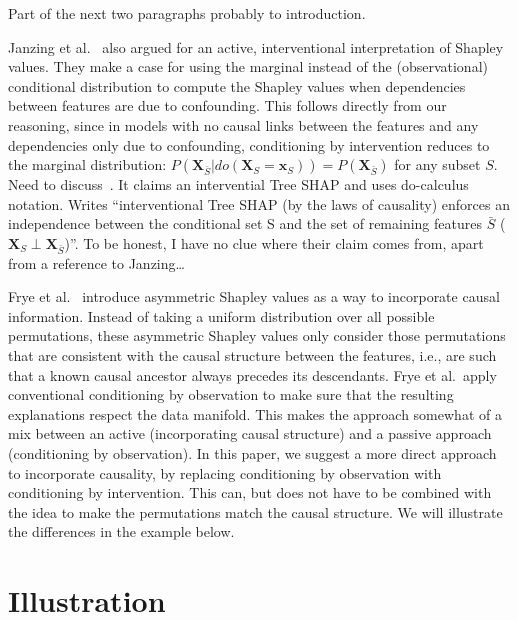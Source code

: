 \documentclass{article}
\newcommand{\vX}{\mathbf{X}}
\newcommand{\vx}{\mathbf{x}}
\newcommand{\dodo}{\mathit{do}}
\newcommand{\lvdo}[1]{\dodo(\vX_{#1} = \vx_{#1})}
\newcommand{\comment}[1]{{\color{red} #1}}
\begin{document}
\comment{Part of the next two paragraphs probably to introduction.}

Janzing et al.~\cite{janzing2019feature} also argued for an active, interventional interpretation of Shapley values. They make a case for using the marginal instead of the (observational) conditional distribution to compute the Shapley values when dependencies between features are due to confounding. This follows directly from our reasoning, since in models with no causal links between the features and any dependencies only due to confounding, conditioning by intervention reduces to the marginal distribution: $P(\vX_{\bar{S}}|\lvdo{S}) = P(\vX_{\bar{S}})$ for any subset $S$. \comment{Need to discuss~\cite{lundberg2020local}. It claims an intervential Tree SHAP and uses do-calculus notation. Writes ``interventional Tree SHAP (by the laws of causality) enforces an independence between the conditional set S and the set of remaining features $\bar{S}$ ($\vX_S \perp \vX_{\bar{S}}$)''. To be honest, I have no clue where their claim comes from, apart from a reference to Janzing\ldots}

Frye et al.~\cite{frye2019asymmetric} introduce asymmetric Shapley values as a way to incorporate causal information. Instead of taking a uniform distribution over all possible permutations, these asymmetric Shapley values only consider those permutations that are consistent with the causal structure between the features, i.e., are such that a known causal ancestor always precedes its descendants. Frye et al.\ apply conventional conditioning by observation to make sure that the resulting explanations respect the data manifold. This makes the approach somewhat of a mix between an active (incorporating causal structure) and a passive approach (conditioning by observation). In this paper, we suggest a more direct approach to incorporate causality, by replacing conditioning by observation with conditioning by intervention. This can, but does not have to be combined with the idea to make the permutations match the causal structure. We will illustrate the differences in the example below.



\section{Illustration}
\end{document}
